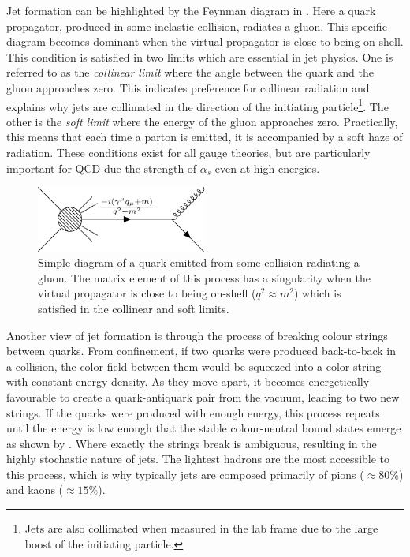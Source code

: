 Jet formation can be highlighted by the Feynman diagram in .
Here a quark propagator, produced in some inelastic collision, radiates a gluon.
This specific diagram becomes dominant when the virtual propagator is close to being on-shell.
This condition is satisfied in two limits which are essential in jet physics.
One is referred to as the \textit{collinear limit} where the angle between the quark and the gluon approaches zero.
This indicates preference for collinear radiation and explains why jets are collimated in the direction of the initiating particle\footnote{Jets are also collimated when measured in the lab frame due to the large boost of the initiating particle.}.
The other is the \textit{soft limit} where the energy of the gluon approaches zero.
Practically, this means that each time a parton is emitted, it is accompanied by a soft haze of radiation.
These conditions exist for all gauge theories, but are particularly important for QCD due the strength of $\alpha_s$ even at high energies.

\begin{figure}[h]
	\centering
	\includegraphics[width=0.5\textwidth]{Feynman/quark_gluon.pdf}
	\caption{Simple diagram of a quark emitted from some collision radiating a gluon. The matrix element of this process has a singularity when the virtual propagator is close to being on-shell ($q^2\approx m^2$) which is satisfied in the collinear and soft limits.}
	\label{fig:quark_gluon}
\end{figure}

Another view of jet formation is through the process of breaking colour strings between quarks.
From confinement, if two quarks were produced back-to-back in a collision, the color field between them would be squeezed into a color string with constant energy density.
As they move apart, it becomes energetically favourable to create a quark-antiquark pair from the vacuum, leading to two new strings.
If the quarks were produced with enough energy, this process repeats until the energy is low enough that the stable colour-neutral bound states emerge as shown by .
Where exactly the strings break is ambiguous, resulting in the highly stochastic nature of jets.
The lightest hadrons are the most accessible to this process, which is why typically jets are composed primarily of pions ($\approx80\%$) and kaons ($\approx15\%$).

